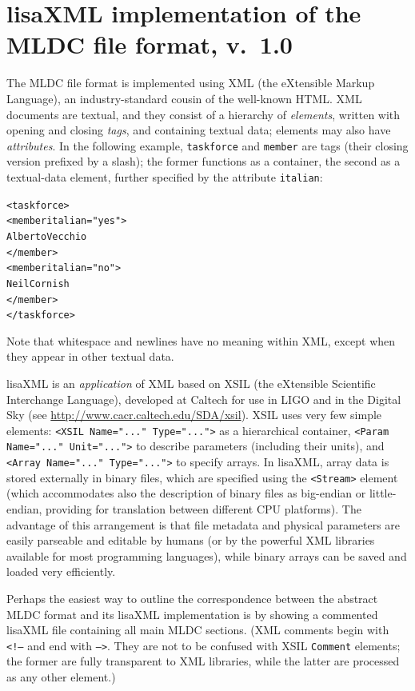 \documentclass[11pt]{report}
\begin{document}
\section{lisaXML implementation of the MLDC file format, v.\ 1.0}

The MLDC file format is implemented using XML (the eXtensible Markup Language), an industry-standard cousin of the well-known HTML. XML documents are textual, and they consist of a hierarchy of \emph{elements}, written with opening and closing \emph{tags}, and containing textual data; elements may also have \emph{attributes}. In the following example, \texttt{taskforce} and \texttt{member} are tags (their closing version prefixed by a slash); the former functions as a container, the second as a textual-data element, further specified by the attribute \texttt{italian}:
%
\begin{alltt}
<taskforce>
  <member italian="yes">
    Alberto Vecchio
  </member>
  <member italian="no">
    Neil Cornish
  </member>
</taskforce>
\end{alltt}
%
Note that whitespace and newlines have no meaning within XML, except when they appear in other textual data.

lisaXML is an \emph{application} of XML based on XSIL (the 
eXtensible Scientific Interchange Language), developed at Caltech for use in LIGO and in the Digital Sky (see \url{http://www.cacr.caltech.edu/SDA/xsil}). XSIL uses very few simple elements: \texttt{<XSIL Name="..." Type="...">} as a hierarchical container, \texttt{<Param Name="..." Unit="...">} to describe parameters (including their units), and \texttt{<Array Name="..." Type="...">} to specify arrays. In lisaXML, array data is stored externally in binary files, which are specified using the \texttt{<Stream>} element (which accommodates also the description of binary files as big-endian or little-endian, providing for translation between different CPU platforms). The advantage of this arrangement is that file metadata and physical parameters are easily parseable and editable by humans (or by the powerful XML libraries available for most programming languages), while binary arrays can be saved and loaded very efficiently.

Perhaps the easiest way to outline the correspondence between the abstract MLDC format and its lisaXML implementation is by showing a commented lisaXML file containing all main MLDC sections. (XML comments begin with \texttt{<!--} and end with \texttt{-->}. They are not to be confused with XSIL \texttt{Comment} elements; the former are fully transparent to XML libraries, while the latter are processed as any other element.)
\end{document}
